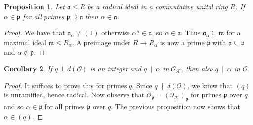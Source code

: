 \documentclass{scrartcl}
\newcommand{\divides}{\ \mid \ }
\newcommand{\notdivides}{\ \nmid \ }
\newcommand{\K}{\mathcal{K}}
\newcommand{\p}{\mathfrak{p}}
\renewcommand{\a}{\mathfrak{a}}
\renewcommand{\O}{\mathcal{O}}
\newtheorem{prop}{Proposition}[section]
\newtheorem{corollary}[prop]{Corollary}
\theoremstyle{definition}
\begin{document}
\begin{prop}
    Let $\a \leq R$ be a radical ideal in a commutative unital ring $R$.
    If $\alpha \in \p$ for all primes $\p \supseteq \a$ then $\alpha \in \a$.
\end{prop}
\begin{proof}
    We have that $\a_\alpha \neq (1)$ otherwise $\alpha^n \in \a$, so $\alpha \in \a$.
    Thus $\a_\alpha \subseteq \mathfrak{m}$ for a maximal ideal $\mathfrak{m} \leq R_\alpha$.
    A preimage under $R \to R_\alpha$ is now a prime $\p$ with $\a \subseteq \p$ and $\alpha \notin \p$.
\end{proof}
\begin{corollary}
    If $q \perp d(\O)$ is an integer and $q \divides \alpha$ in $\O_\K$, then also $q \divides \alpha$ in $\O$.
\end{corollary}
\begin{proof}
    It suffices to prove this for primes $q$.
    Since $q \notdivides d(\O)$, we know that $(q)$ is unramified, hence radical.
    Now observe that $\O_{\p} = (\O_\K)_\p$ for primes $\p$ over $q$ and so $\alpha \in \p$ for all primes $\p$ over $q$.
    The previous proposition now shows that $\alpha \in (q)$.
\end{proof}
\end{document}
